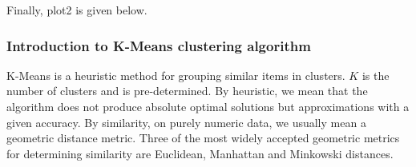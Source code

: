 \documentclass[11pt]{article}
\begin{document}
			\fi
			Finally, plot2 is given below.

			\subsubsection*{Introduction to K-Means clustering algorithm}
				K-Means is a heuristic method for grouping {similar} items in clusters. $K$ is the number of clusters and is pre-determined. By heuristic, we mean that the algorithm does not produce absolute optimal solutions but approximations with a given accuracy. By similarity, on purely numeric data, we usually mean a geometric distance metric. Three of the most widely accepted geometric metrics for determining similarity are Euclidean, Manhattan and Minkowski distances.
\end{document}
